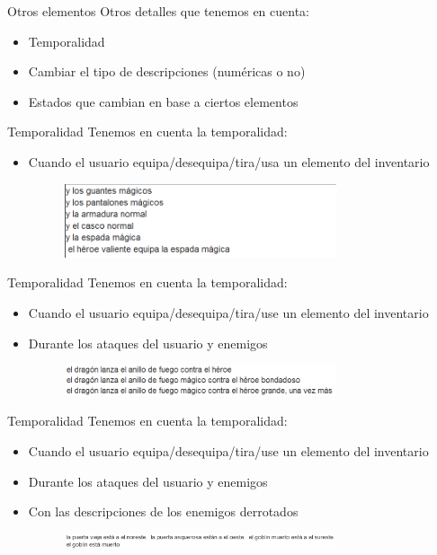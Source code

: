 \begin{tframe}{Otros elementos}
	Otros detalles que tenemos en cuenta:
	\begin{itemize}
		\item<+-| alert@+> Temporalidad
		\item Cambiar el tipo de descripciones (numéricas o no)
		\item Estados que cambian en base a ciertos elementos
	\end{itemize}
\end{tframe}

\begin{tframe}{Temporalidad}
	Tenemos en cuenta la temporalidad:
	\begin{itemize}
		\item<+-| alert@+> Cuando el usuario equipa/desequipa/tira/usa un elemento del inventario
		\begin{figure}[h]
			\includegraphics[width=8cm]{../img/temporalidadEquipar.PNG}
		\end{figure}
	\end{itemize}
\end{tframe}

\begin{tframe}{Temporalidad}
	Tenemos en cuenta la temporalidad:
	\begin{itemize}
		\item Cuando el usuario equipa/desequipa/tira/use un elemento del inventario
		\item<+-| alert@+> Durante los ataques del usuario y enemigos
		\begin{figure}[h]
			\includegraphics[width=8cm]{../img/temporalidadAtaque.PNG}
		\end{figure}
	\end{itemize}
\end{tframe}

\begin{tframe}{Temporalidad}
	Tenemos en cuenta la temporalidad:
	\begin{itemize}
		\item Cuando el usuario equipa/desequipa/tira/use un elemento del inventario
		\item Durante los ataques del usuario y enemigos
		\item<+-| alert@+> Con las descripciones de los enemigos derrotados
		\begin{figure}[h]
			\includegraphics[width=8cm]{../img/enemigosderrotados.PNG}
		\end{figure}
	\end{itemize}
\end{tframe}

